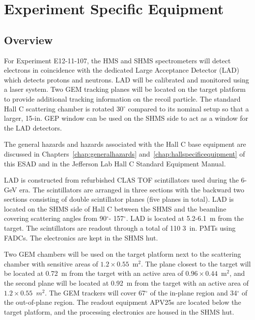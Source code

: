 \chapter{Experiment Specific Equipment}
\label{chap:expspecific}



\section{Overview}
For Experiment E12-11-107, the HMS and SHMS spectrometers will detect electrons in coincidence with the dedicated Large Acceptance Detector (LAD) which detects protons and neutrons. LAD will be calibrated and monitored using a laser system. Two GEM tracking planes will be located on the target platform to provide additional tracking information on the recoil particle. The standard Hall C scattering chamber is rotated 30$^{\circ}$ compared to its nominal setup so that a larger, 15-in. GEP window can be used on the SHMS side to act as a window for the LAD detectors. 

The general hazards and hazards associated with the Hall C base
equipment are discussed in Chapters~\ref{chap:generalhazards}
and~\ref{chap:hallspecificequipment} of this ESAD and in the Jefferson
Lab Hall C Standard Equipment Manual.%

LAD is constructed from refurbished CLAS TOF scintillators used during the 6-GeV era. The scintillators are arranged in three sections with the backward two sections consisting of double scintillator planes (five planes in total). LAD is located on the SHMS side of Hall C between the SHMS and the beamline covering scattering angles from 90$^{\circ}$- 157$^{\circ}$. LAD is located at 5.2-6.1~m from the target. The scintillators are readout through a total of 110 3~in. PMTs using FADCs. The electronics are kept in the SHMS hut. 

Two GEM chambers will be used on the target platform next to the scattering chamber with sensitive areas of $1.2\times 0.55$~m$^2$. The plane closest to the target will be located at 0.72~m from the target with an active area of $0.96\times 0.44$~m$^2$, and the second plane will be located at 0.92~m from the target with an active area of $1.2\times 0.55$~$m^2$. The GEM trackers will cover 67$^{\circ}$ of the in-plane region and 34$^{\circ}$ of the out-of-plane region. The readout equipment APV25s are located below the target platform, and the processing electronics are housed in the SHMS hut. 

